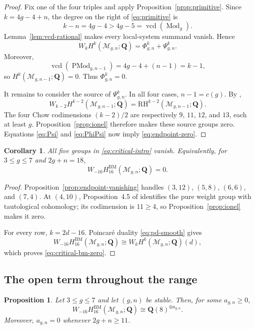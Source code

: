 \documentclass[12pt,reqno]{amsart}
\newcommand{\Q}{\mathbf{Q}}
\newcommand{\M}{\mathcal{M}}
\newcommand{\BM}{\mathrm{BM}}
\newcommand{\RH}{\mathrm{RH}}
\newcommand{\Mod}{\operatorname{Mod}}
\newcommand{\PMod}{\operatorname{PMod}}
\newcommand{\vcd}{\operatorname{vcd}}
\newtheorem{proposition}[theorem]{Proposition}
\newtheorem{corollary}[theorem]{Corollary}
\theoremstyle{definition}
\theoremstyle{remark}
\begin{document}
\begin{proof}
Fix one of the four triples and apply
Proposition~\ref{prop:primitive}.  Since $k=4g-4+n$, the degree on the
right of \eqref{eq:primitive} is
\[
 k-n=4g-4>4g-5=\vcd(\Mod_g).
\]
Lemma~\ref{lem:vcd-rational} makes every local-system summand vanish.
Hence
\begin{equation}\label{eq:PhiPsi}
 W_kH^k(\M_{g,n};\Q)=\Phi^k_{g,n}+\Psi^k_{g,n}.
\end{equation}
Moreover,
\[
 \vcd(\PMod_{g,n-1})=4g-4+(n-1)=k-1,
\]
so $H^k(\M_{g,n-1};\Q)=0$.  Thus $\Phi^k_{g,n}=0$.

It remains to consider the source of $\Psi^k_{g,n}$.  In all four cases,
$n-1=c(g)$.  By \cite[Table~1, Lemma~4.3, and
Proposition~4.5]{CLP},
\[
 W_{k-2}H^{k-2}(\M_{g,n-1};\Q)
 =\RH^{k-2}(\M_{g,n-1};\Q).
\]
The four Chow codimensions $(k-2)/2$ are respectively $9$, $11$, $12$, and
$13$, each at least $g$.  Proposition~\ref{prop:ionel} therefore makes
these source groups zero.  Equations \eqref{eq:Psi} and \eqref{eq:PhiPsi}
now imply \eqref{eq:endpoint-zero}.
\end{proof}

\begin{corollary}\label{cor:critical-vanishing}
All five groups in \eqref{eq:critical-intro} vanish.  Equivalently, for
$3\leq g\leq7$ and $2g+n=18$,
\begin{equation}\label{eq:critical-bm-zero}
 W_{-16}H^{\BM}_{16}(\M_{g,n};\Q)=0.
\end{equation}
\end{corollary}

\begin{proof}
Proposition~\ref{prop:endpoint-vanishing} handles $(3,12)$, $(5,8)$,
$(6,6)$, and $(7,4)$.  At $(4,10)$, Proposition~4.5 of \cite{CLP} identifies the pure
weight group with tautological cohomology; its codimension is $11\geq4$, so
Proposition~\ref{prop:ionel} makes it zero.

For every row, $k=2d-16$.  Poincar\'e duality \eqref{eq:pd-smooth} gives
\[
 W_{-16}H^{\BM}_{16}(\M_{g,n};\Q)
 \cong W_kH^k(\M_{g,n};\Q)(d),
\]
which proves \eqref{eq:critical-bm-zero}.
\end{proof}

\subsection{The open term throughout the range}

\begin{proposition}\label{prop:open-all}
Let $3\leq g\leq7$ and let $(g,n)$ be stable.  Then, for some
$a_{g,n}\geq0$,
\begin{equation}\label{eq:open-all}
 W_{-16}H_{16}^{\BM}(\M_{g,n};\Q)
 \cong\Q(8)^{\oplus a_{g,n}}.
\end{equation}
Moreover, $a_{g,n}=0$ whenever $2g+n\geq11$.
\end{proposition}
\end{document}
